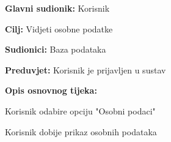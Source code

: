 					\noindent {}
					\begin{packed_item}
	
						\item \textbf{Glavni sudionik: }Korisnik
						\item  \textbf{Cilj:} Vidjeti osobne podatke
						\item  \textbf{Sudionici:} Baza podataka
						\item  \textbf{Preduvjet:} Korisnik je prijavljen u sustav
						\item  \textbf{Opis osnovnog tijeka:}
						
						\item[] \begin{packed_enum}
	
							\item Korisnik odabire opciju "Osobni podaci"
							\item Korisnik dobije prikaz osobnih podataka
						\end{packed_enum}
					\end{packed_item}
					

